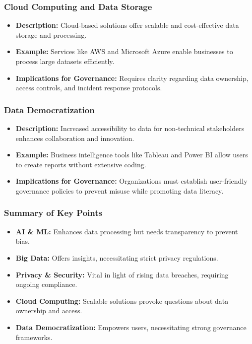 \documentclass[aspectratio=169]{beamer}
\begin{document}
\begin{frame}[fragile]
    \frametitle{Cloud Computing and Data Storage}
    \begin{itemize}
        \item \textbf{Description:} Cloud-based solutions offer scalable and cost-effective data storage and processing.
        \item \textbf{Example:} Services like AWS and Microsoft Azure enable businesses to process large datasets efficiently.
        \item \textbf{Implications for Governance:} Requires clarity regarding data ownership, access controls, and incident response protocols.
    \end{itemize}
\end{frame}

\begin{frame}[fragile]
    \frametitle{Data Democratization}
    \begin{itemize}
        \item \textbf{Description:} Increased accessibility to data for non-technical stakeholders enhances collaboration and innovation.
        \item \textbf{Example:} Business intelligence tools like Tableau and Power BI allow users to create reports without extensive coding.
        \item \textbf{Implications for Governance:} Organizations must establish user-friendly governance policies to prevent misuse while promoting data literacy.
    \end{itemize}
\end{frame}

\begin{frame}[fragile]
    \frametitle{Summary of Key Points}
    \begin{itemize}
        \item \textbf{AI \& ML:} Enhances data processing but needs transparency to prevent bias.
        \item \textbf{Big Data:} Offers insights, necessitating strict privacy regulations.
        \item \textbf{Privacy \& Security:} Vital in light of rising data breaches, requiring ongoing compliance.
        \item \textbf{Cloud Computing:} Scalable solutions provoke questions about data ownership and access.
        \item \textbf{Data Democratization:} Empowers users, necessitating strong governance frameworks.
    \end{itemize}
\end{frame}
\end{document}
